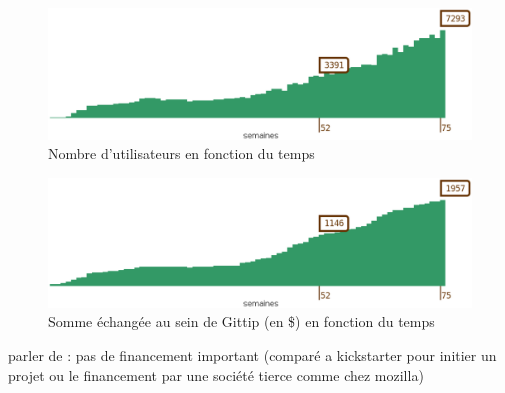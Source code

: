 \begin{figure}[h!]
  \caption{Nombre d'utilisateurs en fonction du temps}
  \centering
    \includegraphics[width=16cm]{images/gittip_amount.eps}
\end{figure}
\begin{figure}[h!]
  \caption{Somme échangée au sein de Gittip (en \$) en fonction du temps}
  \centering
    \includegraphics[width=16cm]{images/gittip_user.eps}
\end{figure}

parler de : pas de financement important (comparé a kickstarter pour initier un projet ou
 le financement par une société tierce comme chez mozilla)



